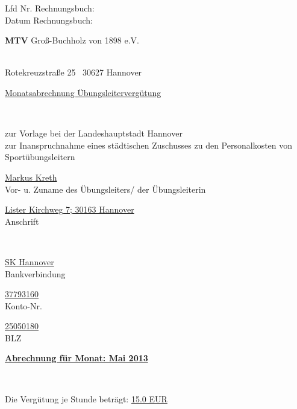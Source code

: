 \documentclass[a4paper,10pt,BCOR=0mm]{scrreprt}
\begin{document}
\begin{flushright}
\parbox{6cm}{Lfd Nr. Rechnungsbuch: \hrulefill \\
Datum Rechnungsbuch: \hrulefill }
\end{flushright}
\begin{center}
\begin{Large}\textbf{MTV} Groß-Buchholz von 1898 e.V.                                        \end{Large}\\
Rotekreuzstraße 25 \textperiodcentered\ 30627 Hannover\\[.4cm]
\begin{huge}\underline{Monatsabrechnung Übungsleitervergütung}\end{huge}\\
\begin{scriptsize}zur Vorlage bei der Landeshauptstadt Hannover\\
zur Inanspruchnahme eines städtischen Zuschusses zu den Personalkosten von Sportübungsleitern\\[.7cm]
\end{scriptsize}

\parbox{0,49\textwidth}{
\begin{center}
\hrulefill\underline{Markus Kreth}\hrulefill\\
Vor- u. Zuname des Übungsleiters/ der Übungsleiterin
\end{center}
}
\hfill
\parbox{0,49\textwidth}{\begin{center}
\hrulefill\underline{Lister Kirchweg 7; 30163 Hannover}\hrulefill\\
Anschrift\end{center}}\\[.7cm]
\parbox{0,32\textwidth}{
\begin{center}
\hrulefill\underline{SK Hannover}\hrulefill\\
Bankverbindung
\end{center}
}
\hfill
\parbox{0,32\textwidth}{
\begin{center}
\hrulefill\underline{37793160}\hrulefill\\
Konto-Nr.
\end{center}
}
\hfill
\parbox{0,32\textwidth}{
\begin{center}
\hrulefill\underline{25050180}\hrulefill\\
BLZ
\end{center}
}
\parbox{12cm}{\begin{large}\underline{\textbf{Abrechnung für Monat: Mai 2013}}\end{large}}\\
\parbox{9cm}{Die Vergütung je Stunde beträgt: \underline{15.0 EUR}}
\end{center}\begin{flushright}


\end{flushright}
\end{document}

